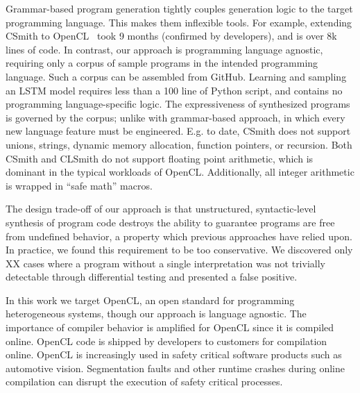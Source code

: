 Grammar-based program generation tightly couples generation logic to the target programming language. This makes them inflexible tools. For example, extending CSmith to OpenCL~\cite{Lidbury2015a} took 9 months (confirmed by developers), and is over 8k lines of code. In contrast, our approach is programming language agnostic, requiring only a corpus of sample programs in the intended programming language. Such a corpus can be assembled from GitHub. Learning and sampling an LSTM model requires less than a 100 line of Python script, and contains no programming language-specific logic. The expressiveness of synthesized programs is governed by the corpus; unlike with grammar-based approach, in which every new language feature must be engineered. E.g. to date, CSmith does not support unions, strings, dynamic memory allocation, function pointers, or recursion. Both CSmith and CLSmith do not support floating point arithmetic, which is dominant in the typical workloads of OpenCL. Additionally, all integer arithmetic is wrapped in ``safe math'' macros.

The design trade-off of our approach is that unstructured, syntactic-level synthesis of program code destroys the ability to guarantee programs are free from undefined behavior, a property which previous approaches have relied upon. In practice, we found this requirement to be too conservative. We discovered only XX cases where a program without a single interpretation was not trivially detectable through differential testing and presented a false positive.

In this work we target OpenCL, an open standard for programming heterogeneous systems, though our approach is language agnostic. The importance of compiler behavior is amplified for OpenCL since it is compiled online. OpenCL code is shipped by developers to customers for compilation online. OpenCL is increasingly used in safety critical software products such as automotive vision. Segmentation faults and other runtime crashes during online compilation can disrupt the execution of safety critical processes.

